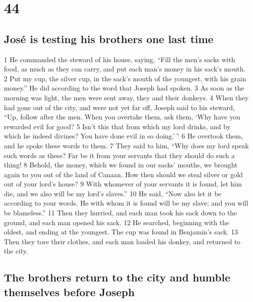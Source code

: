 \hypertarget{section-43}{%
\section{44}\label{section-43}}

\hypertarget{josuxe9-is-testing-his-brothers-one-last-time}{%
\subsection{José is testing his brothers one last
time}\label{josuxe9-is-testing-his-brothers-one-last-time}}

{1} He commanded the steward of his house, saying, ``Fill the men's
sacks with food, as much as they can carry, and put each man's money in
his sack's mouth. {2} Put my cup, the silver cup, in the sack's mouth of
the youngest, with his grain money.'' He did according to the word that
Joseph had spoken. {3} As soon as the morning was light, the men were
sent away, they and their donkeys. {4} When they had gone out of the
city, and were not yet far off, Joseph said to his steward, ``Up, follow
after the men. When you overtake them, ask them, `Why have you rewarded
evil for good? {5} Isn't this that from which my lord drinks, and by
which he indeed divines? You have done evil in so doing.'\,'' {6} He
overtook them, and he spoke these words to them. {7} They said to him,
``Why does my lord speak such words as these? Far be it from your
servants that they should do such a thing! {8} Behold, the money, which
we found in our sacks' mouths, we brought again to you out of the land
of Canaan. How then should we steal silver or gold out of your lord's
house? {9} With whomever of your servants it is found, let him die, and
we also will be my lord's slaves.'' {10} He said, ``Now also let it be
according to your words. He with whom it is found will be my slave; and
you will be blameless.'' {11} Then they hurried, and each man took his
sack down to the ground, and each man opened his sack. {12} He searched,
beginning with the oldest, and ending at the youngest. The cup was found
in Benjamin's sack. {13} Then they tore their clothes, and each man
loaded his donkey, and returned to the city.

\hypertarget{the-brothers-return-to-the-city-and-humble-themselves-before-joseph}{%
\subsection{The brothers return to the city and humble themselves before
Joseph}\label{the-brothers-return-to-the-city-and-humble-themselves-before-joseph}}

